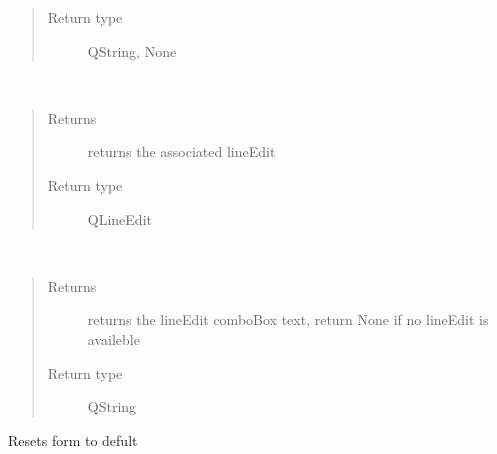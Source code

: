 \documentclass[letterpaper,10pt,english]{sphinxmanual}
\begin{document}
\begin{fulllineitems}
\begin{fulllineitems}
\begin{quote}
\begin{description}
\item[{Return type}] \leavevmode
QString, None

\end{description}\end{quote}

\end{fulllineitems}


\begin{fulllineitems}
\label{\detokenize{code:AttributeForm.AttributeForm.getLineEdit}}~\begin{quote}\begin{description}
\item[{Returns}] \leavevmode
returns the associated lineEdit

\item[{Return type}] \leavevmode
QLineEdit

\end{description}\end{quote}

\end{fulllineitems}


\begin{fulllineitems}
\label{\detokenize{code:AttributeForm.AttributeForm.getLineEditText}}~\begin{quote}\begin{description}
\item[{Returns}] \leavevmode
returns the lineEdit comboBox text, return None if no lineEdit is availeble

\item[{Return type}] \leavevmode
QString

\end{description}\end{quote}

\end{fulllineitems}


\begin{fulllineitems}
\label{\detokenize{code:AttributeForm.AttributeForm.reset}}
Resets form to defult


\end{fulllineitems}
\end{fulllineitems}
\end{document}
